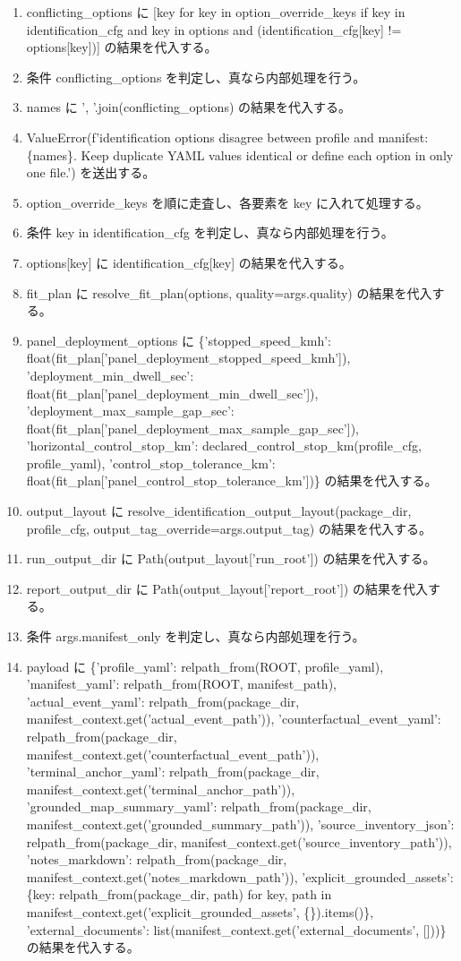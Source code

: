 \documentclass[a4paper,11pt]{article}
\begin{document}
\begin{enumerate}[leftmargin=1.8em]
\item conflicting\_options に [key for key in option\_override\_keys if key in identification\_cfg and key in options and (identification\_cfg[key] != options[key])] の結果を代入する。
\item 条件 conflicting\_options を判定し、真なら内部処理を行う。
\item   names に ', '.join(conflicting\_options) の結果を代入する。
\item   ValueError(f'identification options disagree between profile and manifest: \{names\}. Keep duplicate YAML values identical or define each option in only one file.') を送出する。
\item option\_override\_keys を順に走査し、各要素を key に入れて処理する。
\item   条件 key in identification\_cfg を判定し、真なら内部処理を行う。
\item     options[key] に identification\_cfg[key] の結果を代入する。
\item fit\_plan に resolve\_fit\_plan(options, quality=args.quality) の結果を代入する。
\item panel\_deployment\_options に \{'stopped\_speed\_kmh': float(fit\_plan['panel\_deployment\_stopped\_speed\_kmh']), 'deployment\_min\_dwell\_sec': float(fit\_plan['panel\_deployment\_min\_dwell\_sec']), 'deployment\_max\_sample\_gap\_sec': float(fit\_plan['panel\_deployment\_max\_sample\_gap\_sec']), 'horizontal\_control\_stop\_km': declared\_control\_stop\_km(profile\_cfg, profile\_yaml), 'control\_stop\_tolerance\_km': float(fit\_plan['panel\_control\_stop\_tolerance\_km'])\} の結果を代入する。
\item output\_layout に resolve\_identification\_output\_layout(package\_dir, profile\_cfg, output\_tag\_override=args.output\_tag) の結果を代入する。
\item run\_output\_dir に Path(output\_layout['run\_root']) の結果を代入する。
\item report\_output\_dir に Path(output\_layout['report\_root']) の結果を代入する。
\item 条件 args.manifest\_only を判定し、真なら内部処理を行う。
\item   payload に \{'profile\_yaml': relpath\_from(ROOT, profile\_yaml), 'manifest\_yaml': relpath\_from(ROOT, manifest\_path), 'actual\_event\_yaml': relpath\_from(package\_dir, manifest\_context.get('actual\_event\_path')), 'counterfactual\_event\_yaml': relpath\_from(package\_dir, manifest\_context.get('counterfactual\_event\_path')), 'terminal\_anchor\_yaml': relpath\_from(package\_dir, manifest\_context.get('terminal\_anchor\_path')), 'grounded\_map\_summary\_yaml': relpath\_from(package\_dir, manifest\_context.get('grounded\_summary\_path')), 'source\_inventory\_json': relpath\_from(package\_dir, manifest\_context.get('source\_inventory\_path')), 'notes\_markdown': relpath\_from(package\_dir, manifest\_context.get('notes\_markdown\_path')), 'explicit\_grounded\_assets': \{key: relpath\_from(package\_dir, path) for key, path in manifest\_context.get('explicit\_grounded\_assets', \{\}).items()\}, 'external\_documents': list(manifest\_context.get('external\_documents', []))\} の結果を代入する。

\end{enumerate}
\end{document}
